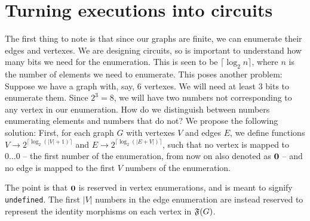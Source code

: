 \documentclass[preliminary,copyright,creativecommons,sharealike,noncommercial]{eptcs}
\begin{document}
\section{Turning executions into circuits}\label{sec: turning executions into circuits}
%
The first thing to note is that since our graphs are finite, we can 
enumerate their edges and vertexes. We are designing circuits, 
so is important to understand how many bits we need for the 
enumeration. This is seen to be $\lceil \log_2{n} \rceil$, where 
$n$ is the number of elements we need to enumerate. This poses 
another problem: Suppose we have a graph with, say, $6$ 
vertexes. We will need at least $3$ bits to enumerate them. 
Since $2^3 = 8$, we will have two numbers not corresponding 
to any vertex in our enumeration. How do we distinguish 
between numbers enumerating elements and numbers that do 
not? We propose the following solution: First, for each graph $G$ 
with vertexes $V$ and edges $E$, we define functions
$V \to 2^{\lceil \log_2 (|V|+1) \rceil}$ and 
$E \to 2^{\lceil \log_2 (|E+V|) \rceil}$, such that no vertex is 
mapped to $0 \dots 0$ -- the first number of the enumeration, 
from now on also denoted as $\textbf{0}$ -- and no edge is mapped 
to the first $V$ numbers of the enumeration.

The point is that $\textbf{0}$ is reserved in vertex enumerations, 
and is meant to signify \texttt{undefined}. The first $|V|$ numbers 
in the edge enumeration are instead reserved to represent the 
identity morphisms on each vertex in $\mathfrak{F}(G)$. 
\end{document}
